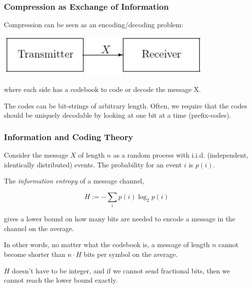 \documentclass{beamer}
\begin{document}
\begin{frame}
\frametitle{Compression as Exchange of Information}
Compression can be seen as an encoding/decoding problem:
\begin{center}
\includegraphics[width=0.8\textwidth]{communicationsystem}
\end{center}

where each side has a codebook to code or decode the message X. 

The codes can be bit-strings of arbitrary length.
Often, we require that the codes should be 
uniquely decodable by looking at one bit at a time (prefix-codes).
\end{frame}

\begin{frame}
\frametitle{Information and Coding Theory}
Consider the message $X$ of length $n$ as a random process 
with i.i.d. (independent, identically distributed) events. 
The probability for an event $i$ is $p(i)$. 

\begin{Theorem}
The \textit{information entropy} 
of a message channel, 

$$H := -\sum_i p(i)\log_2 p(i)$$

gives a lower bound on how many bits are needed to encode  
a message in the channel on the average. 
\end{Theorem}

In other words, no matter what the codebook is, a message of 
length $n$ cannot become shorter than $n\cdot H$ bits per 
symbol on the average. 

$H$ doesn't have to be integer, and if we cannot send fractional 
bits, then we cannot reach the lower bound exactly.
\end{frame}
\end{document}
